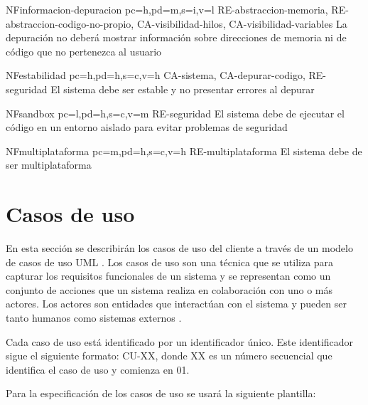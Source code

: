 \begin{softwareReq}{NF}{informacion-depuracion}
    {pc=h,pd=m,s=i,v=l}
    {RE-abstraccion-memoria, RE-abstraccion-codigo-no-propio, CA-visibilidad-hilos, CA-visibilidad-variables}
    La depuración no deberá mostrar información sobre direcciones de memoria ni de código que no pertenezca al usuario
\end{softwareReq}

\begin{softwareReq}{NF}{estabilidad}
    {pc=h,pd=h,s=c,v=h}
    {CA-sistema, CA-depurar-codigo, RE-seguridad}
    El sistema debe ser estable y no presentar errores al depurar
\end{softwareReq}

\begin{softwareReq}{NF}{sandbox}
    {pc=l,pd=h,s=c,v=m}
    {RE-seguridad}
    El sistema debe de ejecutar el código en un entorno aislado para evitar problemas de seguridad
\end{softwareReq}

\begin{softwareReq}{NF}{multiplataforma}
    {pc=m,pd=h,s=c,v=h}
    {RE-multiplataforma}
    El sistema debe de ser multiplataforma
\end{softwareReq}

\FloatBarrier

\section{Casos de uso}\label{sec:casos-de-uso}

En esta sección se describirán los casos de uso del cliente a través de un modelo de casos de uso UML \cite{Cook2017}. Los casos de uso son una técnica que se utiliza para capturar los requisitos funcionales de un sistema y se representan como un conjunto de acciones que un sistema realiza en colaboración con uno o más actores. Los actores son entidades que interactúan con el sistema y pueden ser tanto humanos como sistemas externos \cite{UseCases-Wikipedia}.

Cada caso de uso está identificado por un identificador único. Este identificador sigue el siguiente formato: CU-XX, donde XX es un número secuencial que identifica el caso de uso y comienza en 01.


Para la especificación de los casos de uso se usará la siguiente plantilla:

